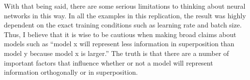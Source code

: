 \documentclass{article} %
\begin{document}
With that being said, there are some serious limitations to thinking about neural 
networks in this way. In all the examples in this replication, the result was 
highly dependent on the exact training conditions such as learning rate and 
batch size. Thus, I believe that it is wise to be cautious when making broad 
claims about models such as ``model x will represent less information in 
superposition than model y because model x is larger.'' The truth is that there 
are a number of important factors that influence whether or not a model will
represent information orthogonally or in superposition.



\end{document}
